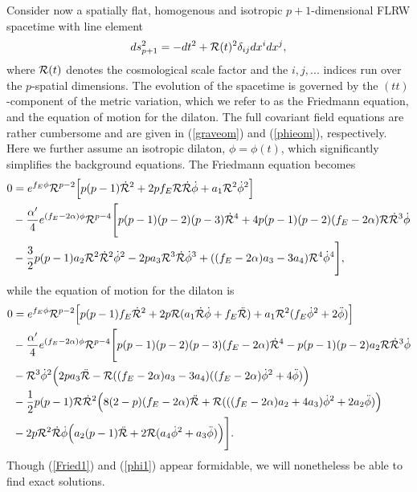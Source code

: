 \documentclass[amsmath,amssymb,11pt]{article}
\begin{document}
Consider now a spatially flat, homogenous and isotropic $p+1$-dimensional FLRW spacetime with line element 
\begin{equation}
ds_{p+1}^2 = -dt^2+\mathcal{R}(t)^2\delta_{ij}dx^i dx^j,
\end{equation}
where $\mathcal{R}(t)$ denotes the cosmological scale factor and the $i,j,...$ indices run over the $p$-spatial dimensions. The evolution of the spacetime is governed by the $(tt)$-component of the metric variation, which we refer to as the Friedmann equation, and the equation of motion for the dilaton. The full covariant field equations are rather cumbersome and are given in (\ref{graveom}) and (\ref{phieom}), respectively. Here we further assume an isotropic dilaton, $\phi=\phi(t)$, which significantly simplifies the background equations. The Friedmann equation  becomes
\begin{equation}\label{Fried1}
\begin{split}
0&=e^{f_E \phi}\mathcal{R}^{p-2}\Big[p(p-1)\dot{\mathcal{R}}^2 +2pf_E \mathcal{R}\dot{\mathcal{R}}\dot{\phi}+a_1\mathcal{R}^2\dot{\phi}^2 \Big] \\
&-\frac{\alpha'}{4}e^{(f_E-2\alpha)\phi}\mathcal{R}^{p-4}\Bigg[p(p-1)(p-2)(p-3)\dot{\mathcal{R}}^4+4p(p-1)(p-2)(f_E-2\alpha)\mathcal{R}\dot{\mathcal{R}}^3\dot{\phi} \\
&-\frac{3}{2}p(p-1)a_2\mathcal{R}^2\dot{\mathcal{R}}^2\dot{\phi}^2 
-2pa_3\mathcal{R}^3\dot{\mathcal{R}}\dot{\phi}^3+((f_E-2\alpha)a_3-3a_4)\mathcal{R}^4\dot{\phi}^4\Bigg],
\end{split}
\end{equation}
while the equation of motion for the dilaton is
\begin{equation}\label{phi1}
\begin{split} 
0&=e^{f_E\phi}\mathcal{R}^{p-2}\Big[p(p-1)f_E\dot{\mathcal{R}}^2+2p\mathcal{R}(a_1\dot{\mathcal{R}}\dot{\phi}+f_E\ddot{\mathcal{R}})+a_1\mathcal{R}^2(f_E\dot{\phi}^2+2\ddot{\phi})\Big] \\
&-\frac{\alpha'}{4}e^{(f_E-2\alpha)\phi}\mathcal{R}^{p-4}\Bigg[p(p-1)(p-2)(p-3)(f_E-2\alpha)\dot{\mathcal{R}}^4-p(p-1)(p-2)a_2\mathcal{R}\dot{\mathcal{R}}^3\dot{\phi} \\
&-\mathcal{R}^3\dot{\phi}^2\Big(2pa_3\ddot{\mathcal{R}}-\mathcal{R}((f_E-2\alpha)a_3-3a_4)((f_E-2\alpha)\dot{\phi}^2+4\ddot{\phi})\Big) \\
&-\frac{1}{2}p(p-1)\mathcal{R}\dot{\mathcal{R}}^2\Big(8(2-p)(f_E-2\alpha)\ddot{\mathcal{R}}+\mathcal{R}(((f_E-2\alpha)a_2+4a_3)\dot{\phi}^2+2a_2\ddot{\phi})\Big) \\
&-2p\mathcal{R}^2\dot{\mathcal{R}}\dot{\phi}\Big(a_2(p-1)\ddot{\mathcal{R}}+2\mathcal{R}(a_4\dot{\phi}^2+a_3\ddot{\phi})\Big)\Bigg].
\end{split}
\end{equation}
Though (\ref{Fried1}) and (\ref{phi1}) appear formidable, we will nonetheless be able to find exact solutions.
\end{document}
